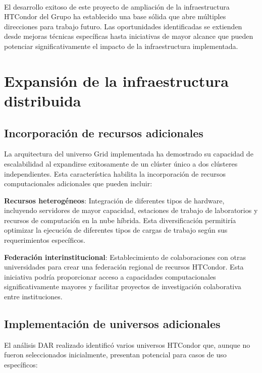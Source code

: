 \label{cap:trabajos-futuros}
\mbox{}\\

El desarrollo exitoso de este proyecto de ampliación de la infraestructura HTCondor del Grupo \GRID ha establecido una base sólida que abre múltiples direcciones para trabajo futuro. Las oportunidades identificadas se extienden desde mejoras técnicas específicas hasta iniciativas de mayor alcance que pueden potenciar significativamente el impacto de la infraestructura implementada.

\section{Expansión de la infraestructura distribuida}
\noindent

\subsection{Incorporación de recursos adicionales}
\noindent

La arquitectura del universo Grid implementada ha demostrado su capacidad de escalabilidad al expandirse exitosamente de un clúster único a dos clústeres independientes. Esta característica habilita la incorporación de recursos computacionales adicionales que pueden incluir:

\textbf{Recursos heterogéneos}: Integración de diferentes tipos de hardware, incluyendo servidores de mayor capacidad, estaciones de trabajo de laboratorios y recursos de computación en la nube híbrida. Esta diversificación permitiría optimizar la ejecución de diferentes tipos de cargas de trabajo según sus requerimientos específicos.

\textbf{Federación interinstitucional}: Establecimiento de colaboraciones con otras universidades para crear una federación regional de recursos HTCondor. Esta iniciativa podría proporcionar acceso a capacidades computacionales significativamente mayores y facilitar proyectos de investigación colaborativa entre instituciones.

\subsection{Implementación de universos adicionales}
\noindent

El análisis DAR realizado identificó varios universos HTCondor que, aunque no fueron seleccionados inicialmente, presentan potencial para casos de uso específicos:

